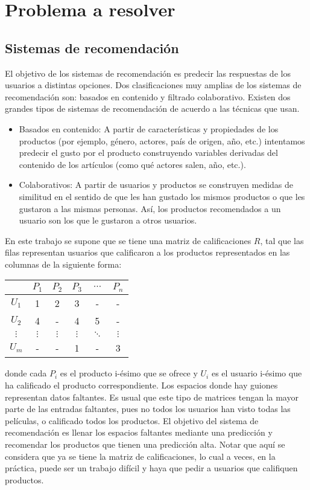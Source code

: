 \chapter{Problema a resolver}

\section{Sistemas de recomendación}

El objetivo de los sistemas de recomendación es predecir las respuestas de los usuarios a distintas opciones. Dos clasificaciones muy amplias de los sistemas de recomendación son: basados en contenido y filtrado colaborativo. Existen dos grandes tipos de sistemas de recomendación de acuerdo a las técnicas que usan.

\begin{itemize}
\item Basados en contenido: A partir de características y propiedades de los productos (por ejemplo, género, actores, país de origen, año, etc.) intentamos predecir el gusto por el producto construyendo variables derivadas del contenido de los artículos (como qué actores salen, año, etc.).
\item Colaborativos: A partir de usuarios y productos se construyen medidas de similitud en el sentido de que les han gustado los mismos productos o que les gustaron a las mismas personas. Así, los productos recomendados a un usuario son los que le gustaron a otros usuarios.
\end{itemize}

En este trabajo se supone que se tiene una matriz de calificaciones $R$, tal que las filas representan usuarios que calificaron a los productos representados en las columnas de la siguiente forma:

\begin{center}
\begin{tabular}{ c | c  c c c c}
    & $P_1$ & $P_2$ & $P_3$ & $\cdots$ & $P_n$ \\
  \hline                       
  $U_1$ & 1 & 2 & 3 & - & - \\
  $U_2$ & 4 & - & 4 & 5  & -\\
  $\vdots$ & $\vdots$ & $\vdots$ & $\vdots$ & $\ddots$ & $\vdots$\\
  $U_m$ & - & - & 1 & - & 3\\
  \hline  
\end{tabular}
\end{center}


donde cada $P_i$ es el producto i-ésimo que se ofrece y $U_i$ es el usuario i-ésimo que ha calificado el producto correspondiente. Los espacios donde hay guiones representan datos faltantes. Es usual que este tipo de matrices tengan la mayor parte de las entradas faltantes, pues no todos los usuarios han visto todas las películas, o calificado todos los productos. El objetivo del sistema de recomendación es llenar los espacios faltantes mediante una predicción y recomendar los productos que tienen una predicción alta. Notar que aquí se considera que ya se tiene la matriz de calificaciones, lo cual a veces, en la práctica, puede ser un trabajo difícil y haya que pedir a usuarios que califiquen productos.

